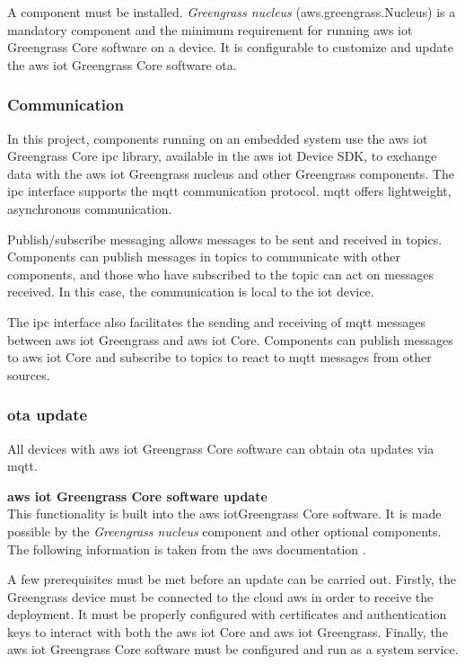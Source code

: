 A component must be installed. \textit{Greengrass nucleus} (aws.greengrass.Nucleus) is a mandatory component and the minimum requirement for running \gls{aws} \acrshort{iot} Greengrass Core software on a device. It is configurable to customize and update the \gls{aws} \acrshort{iot} Greengrass Core software \acrlong{ota}.

\subsubsection{Communication}
In this project, components running on an embedded system use the \gls{aws} \acrshort{iot} Greengrass Core \acrfull{ipc} library, available in the \gls{aws} \acrshort{iot} Device SDK, to exchange data with the \gls{aws} \acrshort{iot} Greengrass nucleus and other Greengrass components. The \acrshort{ipc} interface supports the \acrlong{mqtt} communication protocol. \acrshort{mqtt} offers lightweight, asynchronous communication.

Publish/subscribe messaging allows messages to be sent and received in topics. Components can publish messages in topics to communicate with other components, and those who have subscribed to the topic can act on messages received. In this case, the communication is local to the \acrshort{iot} device.

The \acrshort{ipc} interface also facilitates the sending and receiving of \acrshort{mqtt} messages between \gls{aws} \acrshort{iot} Greengrass and \gls{aws} \acrshort{iot} Core. Components can publish messages to \gls{aws} \acrshort{iot} Core and subscribe to topics to react to \acrshort{mqtt} messages from other sources.

\subsubsection{\acrshort{ota} update}
All devices with \gls{aws} \acrshort{iot} Greengrass Core software can obtain \acrshort{ota} updates via \acrshort{mqtt}.

\textbf{\gls{aws} \acrshort{iot} Greengrass Core software update}\\
This functionality is built into the \gls{aws} \acrshort{iot}Greengrass Core software. It is made possible by the \textit{Greengrass nucleus} component and other optional components. The following information is taken from the \gls{aws} documentation \cite{ota_aws_iot}.

A few prerequisites must be met before an update can be carried out. Firstly, the Greengrass device must be connected to the \gls{cloud} \gls{aws} in order to receive the deployment. It must be properly configured with certificates and authentication keys to interact with both the \gls{aws} \acrshort{iot} Core and \gls{aws} \acrshort{iot} Greengrass. Finally, the \gls{aws} \acrshort{iot} Greengrass Core software must be configured and run as a system service.

